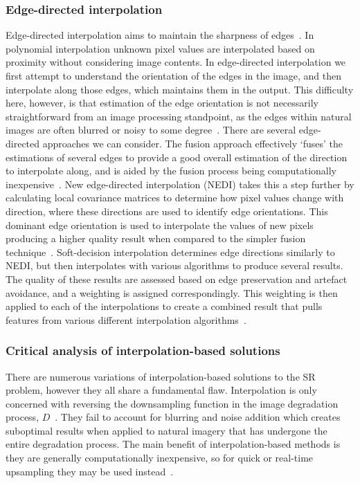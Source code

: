\subsubsection{Edge-directed interpolation}
Edge-directed interpolation aims to maintain the sharpness of edges~\cite{interpolation}. In polynomial interpolation unknown pixel values are interpolated based on proximity without considering image contents. In edge-directed interpolation we first attempt to understand the orientation of the edges in the image, and then interpolate along those edges, which maintains them in the output. This difficulty here, however, is that estimation of the edge orientation is not necessarily straightforward from an image processing standpoint, as the edges within natural images are often blurred or noisy to some degree~\cite{interpolation}. There are several edge-directed approaches we can consider. The fusion approach effectively `fuses' the estimations of several edges to provide a good overall estimation of the direction to interpolate along, and is aided by the fusion process being computationally inexpensive~\cite{interpolation}. New edge-directed interpolation (NEDI) takes this a step further by calculating local covariance matrices to determine how pixel values change with direction, where these directions are used to identify edge orientations. This dominant edge orientation is used to interpolate the values of new pixels producing a higher quality result when compared to the simpler fusion technique~\cite{ref}. Soft-decision interpolation determines edge directions similarly to NEDI, but then interpolates with various algorithms to produce several results. The quality of these results are assessed based on edge preservation and artefact avoidance, and a weighting is assigned correspondingly. This weighting is then applied to each of the interpolations to create a combined result that pulls features from various different interpolation algorithms~\cite{ref}.

\subsubsection{Critical analysis of interpolation-based solutions}
There are numerous variations of interpolation-based solutions to the SR problem, however they all share a fundamental flaw. Interpolation is only concerned with reversing the downsampling function in the image degradation process, $D$~\cite{interpolation}. They fail to account for blurring and noise addition which creates suboptimal results when applied to natural imagery that has undergone the entire degradation process. The main benefit of interpolation-based methods is they are generally computationally inexpensive, so for quick or real-time upsampling they may be used instead~\cite{interpolation}.

